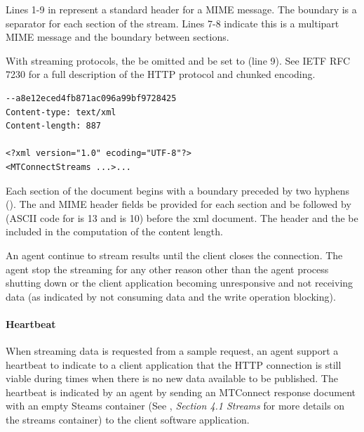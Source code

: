 \documentclass{mtconnect}	%
\begin{document}
Lines 1-9 in  represent a standard header for a MIME  message.  The boundary is a separator for each section of the stream. Lines 7-8 indicate this is a multipart MIME message and the boundary between sections. 

With streaming protocols, the  \MUST be omitted and  \MUST be set to  (line 9). See IETF RFC 7230 for a full description of the HTTP protocol and chunked encoding.
\begin{lstlisting}[firstnumber=10,escapechar=|,%
    caption={HTTP Response header 2},label={lst:http-response-header-2}]
--a8e12eced4fb871ac096a99bf9728425
Content-type: text/xml
Content-length: 887

<?xml version="1.0" ecoding="UTF-8"?>
<MTConnectStreams ...>...
\end{lstlisting}

Each section of the document begins with a boundary preceded by two hyphens (\cfont{--}). The  and  MIME header fields \MUST be provided for each section and \MUST be followed by  (ASCII code for  is 13 and  is 10) before the \gls{xml} document. The header and the  \MUSTNOT be included in the computation of the content length.

An \gls{agent} \MUST continue to stream results until the client closes the connection.  The \gls{agent} \MUSTNOT stop the streaming for any other reason other than the \gls{agent} process shutting down or the client application becoming unresponsive and not receiving data (as indicated by not consuming data and the write operation blocking).

\paragraph{Heartbeat}\mbox{}

When \gls{streaming data} is requested from a \gls{sample request}, an \gls{agent} \MUST support a \gls{heartbeat} to indicate to a client application that the HTTP connection is still viable during times when there is no new data available to be published.  The \gls{heartbeat} is indicated by an \gls{agent} by sending an MTConnect \gls{response document} with an empty Steams container (See , \textit{Section 4.1 Streams} for more details on the \gls{streams} container) to the client software application.
\end{document}
